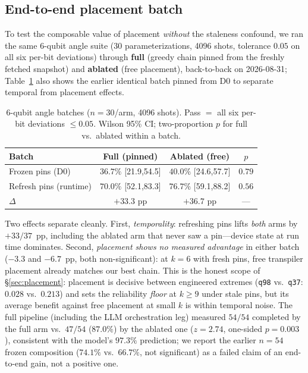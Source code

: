 \documentclass[journal,10pt,twocolumn]{IEEEtran}
\newcommand{\q}[1]{\texttt{q#1}}
\begin{document}
\subsection{End-to-end placement batch}
\label{sec:e2ebatch}
To test the composable value of placement \emph{without} the staleness confound, we ran the same 6-qubit angle suite
(30 parameterizations, 4096 shots, tolerance $0.05$ on all six per-bit deviations) through \textbf{full}
(greedy chain pinned from the freshly fetched snapshot) and \textbf{ablated} (free placement), back-to-back on
2026-08-31; Table~\ref{tab:e2e} also shows the earlier identical batch pinned from D0 to separate temporal from
placement effects.

\begin{table}[t]
\caption{6-qubit angle batches ($n{=}30$/arm, 4096 shots). Pass $=$ all six per-bit deviations $\le0.05$. Wilson
95\% CI; two-proportion $p$ for full vs.\ ablated within a batch.}
\label{tab:e2e}
\centering
\footnotesize
\setlength{\tabcolsep}{4pt}
\begin{tabular}{@{}lccc@{}}
\toprule
Batch & Full (pinned) & Ablated (free) & $p$\\
\midrule
Frozen pins (D0)  & $36.7\%$ [21.9,54.5] & $40.0\%$ [24.6,57.7] & $0.79$\\
Refresh pins (runtime) & $70.0\%$ [52.1,83.3] & $76.7\%$ [59.1,88.2] & $0.56$\\
\midrule
$\Delta$ & $+33.3$ pp & $+36.7$ pp & ---\\
\bottomrule
\end{tabular}
\end{table}

Two effects separate cleanly. First, \emph{temporality}: refreshing pins lifts \emph{both} arms by $+33/37$~pp,
including the ablated arm that never saw a pin---device state at run time dominates. Second, \emph{placement shows no
measured advantage} in either batch ($-3.3$ and $-6.7$~pp, both non-significant): at $k{=}6$ with fresh pins, free
transpiler placement already matches our best chain. This is the honest scope of \S\ref{sec:placement}: placement is
decisive between engineered extremes (\q{98} vs.\ \q{37}: $0.028$ vs.\ $0.213$) and sets the reliability \emph{floor}
at $k\ge9$ under stale pins, but its average benefit against free placement at small $k$ is within temporal noise.
The full pipeline (including the LLM orchestration leg) measured $54/54$ completed by the full arm vs.\ $47/54$
($87.0\%$) by the ablated one ($z{=}2.74$, one-sided $p{=}0.003$), consistent with the model's $97.3\%$ prediction;
we report the earlier $n{=}54$ frozen composition ($74.1\%$ vs.\ $66.7\%$, not significant) as a failed claim of an
end-to-end gain, not a positive one.
\end{document}
